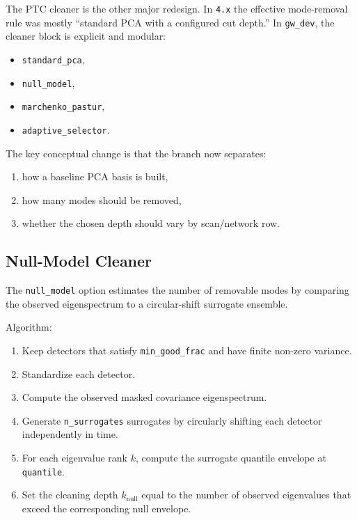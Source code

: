 \documentclass[11pt]{article}
\begin{document}
The PTC cleaner is the other major redesign. In \texttt{4.x} the effective
mode-removal rule was mostly ``standard PCA with a configured cut depth.''
In \texttt{gw\_dev}, the cleaner block is explicit and modular:

\begin{itemize}[leftmargin=1.5em]
\item \texttt{standard\_pca},
\item \texttt{null\_model},
\item \texttt{marchenko\_pastur},
\item \texttt{adaptive\_selector}.
\end{itemize}

The key conceptual change is that the branch now separates:

\begin{enumerate}[leftmargin=1.5em]
\item how a baseline PCA basis is built,
\item how many modes should be removed,
\item whether the chosen depth should vary by scan/network row.
\end{enumerate}

\subsection{Null-Model Cleaner}

The \texttt{null\_model} option estimates the number of removable modes by
comparing the observed eigenspectrum to a circular-shift surrogate ensemble.

Algorithm:

\begin{enumerate}[leftmargin=1.5em]
\item Keep detectors that satisfy \texttt{min\_good\_frac} and have finite
non-zero variance.
\item Standardize each detector.
\item Compute the observed masked covariance eigenspectrum.
\item Generate \texttt{n\_surrogates} surrogates by circularly shifting each
detector independently in time.
\item For each eigenvalue rank \(k\), compute the surrogate quantile envelope
at \texttt{quantile}.
\item Set the cleaning depth \(k_{\mathrm{null}}\) equal to the number of
observed eigenvalues that exceed the corresponding null envelope.
\end{enumerate}
\end{document}
